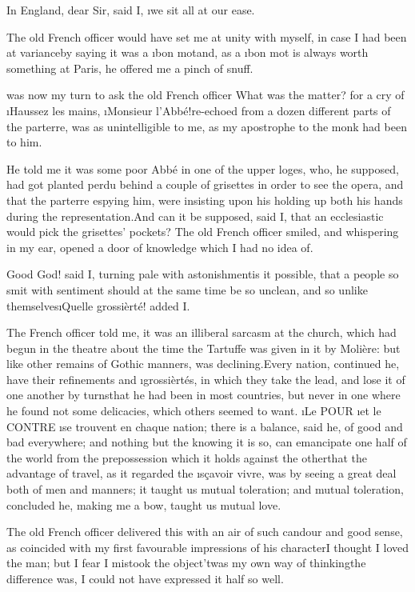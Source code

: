 \documentclass[twoside]{article}
\begin{document}
\tsk In England, dear Sir, said I, \i{we sit all at our ease}.

The old French officer would have set me at unity with myself, in case I
had been at variance\tsk by saying it was a \i{bon mot}\tsk and, as a \i{bon mot}
is always worth something at Paris, he offered me a pinch of snuff.






 was now my turn to ask the old French officer \lqq What was the matter?\rqq
for a cry of \lqq \i{Haussez les mains}, \i{Monsieur l’Abbé}!\rqq re-echoed from a
dozen different parts of the parterre, was as unintelligible to me, as my
apostrophe to the monk had been to him.

He told me it was some poor Abbé in one of the upper loges, who, he
supposed, had got planted perdu behind a couple of grisettes in order to
see the opera, and that the parterre espying him, were insisting upon his
holding up both his hands during the representation.\tsk And can it be
supposed, said I, that an ecclesiastic would pick the grisettes’ pockets?
The old French officer smiled, and whispering in my ear, opened a door of
knowledge which I had no idea of.

Good God! said I, turning pale with astonishment\tsk is it possible, that a
people so smit with sentiment should at the same time be so unclean, and
so unlike themselves\tsk \i{Quelle grossièrté}! added I.

The French officer told me, it was an illiberal sarcasm at the church,
which had begun in the theatre about the time the Tartuffe was given in
it by Molière: but like other remains of Gothic manners, was
declining.\tsk Every nation, continued he, have their refinements and
\i{grossièrtés}, in which they take the lead, and lose it of one another by
turns\tsk that he had been in most countries, but never in one where he
found not some delicacies, which others seemed to want.  \i{Le} POUR \i{et
le} CONTRE \i{se trouvent en chaque nation}; there is a balance, said he,
of good and bad everywhere; and nothing but the knowing it is so, can
emancipate one half of the world from the prepossession which it holds
against the other\tsk that the advantage of travel, as it regarded the
\i{sçavoir vivre}, was by seeing a great deal both of men and manners; it
taught us mutual toleration; and mutual toleration, concluded he, making
me a bow, taught us mutual love.

The old French officer delivered this with an air of such candour and
good sense, as coincided with my first favourable impressions of his
character\tsk I thought I loved the man; but I fear I mistook the
object\tsk ’twas my own way of thinking\tsk the difference was, I could not have
expressed it half so well.
\end{document}
